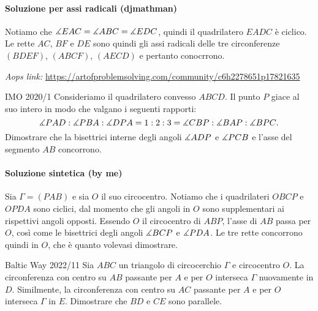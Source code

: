 \documentclass{article}
\begin{document}
\paragraph{Soluzione per assi radicali (djmathman)}
Notiamo che $\measuredangle{EAC}=\measuredangle{ABC}=\measuredangle{EDC}$,
quindi il quadrilatero $EADC$ è ciclico. Le rette $AC$, $BF$ e $DE$
sono quindi gli assi radicali delle tre circonferenze
$(BDEF)$, $(ABCF)$, $(AECD)$ e pertanto conocrrono.

\vspace{0.5cm}

\begin{minipage}{\textwidth}
\textit{Aops link:}
\href{https://artofproblemsolving.com/community/c6h2278651p17821635}
{https://artofproblemsolving.com/community/c6h2278651p17821635}

\begin{proposition*}{IMO 2020/1}{}
	Consideriamo il quadrilatero convesso $ABCD$.
	Il punto $P$ giace al suo intero in modo che valgano i seguenti rapporti:
	\begin{equation*}
		\measuredangle{PAD}:\measuredangle{PBA}:\measuredangle{DPA}=1:2:3=\measuredangle{CBP}:\measuredangle{BAP}:\measuredangle{BPC}.
	\end{equation*}
	Dimostrare che la bisettrici interne degli angoli $\measuredangle{ADP}$ e
	$\measuredangle{PCB}$ e l'asse del segmento $AB$ concorrono.
\end{proposition*}
\end{minipage}

\paragraph{Soluzione sintetica (by me)}

Sia $\Gamma=(PAB)$ e sia $O$ il suo circocentro.
Notiamo che i quadrilateri $OBCP$ e $OPDA$ sono ciclici, dal momento
che gli angoli in $O$ sono supplementari ai rispettivi angoli opposti.
Essendo $O$ il circocentro di $ABP$, l'asse di $AB$ passa per $O$,
così come le bisettrici degli angoli $\measuredangle{BCP}$ e $\measuredangle{PDA}$.
Le tre rette concorrono quindi in $O$, che è quanto volevasi
dimostrare.

\begin{proposition}{Baltic Way 2022/11}{}
	Sia $ABC$ un triangolo di circocerchio $\Gamma$ e circocentro $O$.
	La circonferenza con centro su $AB$ passante per $A$ e per $O$
	interseca $\Gamma$ nuovamente in $D$. Similmente, la circonferenza
	con centro su $AC$ passante per $A$ e per $O$ interseca $\Gamma$ in $E$.
	Dimostrare che $BD$ e $CE$ sono parallele.
\end{proposition}
\end{document}
